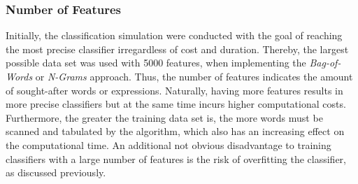 		\subsubsection{Number of Features}
			Initially, the classification simulation were conducted with the goal of reaching the most precise classifier irregardless of cost and duration. Thereby, the largest possible data set was used with 5000 features, when implementing the \textit{Bag-of-Words} or \textit{N-Grams} approach. Thus, the number of features indicates the amount of sought-after words or expressions. Naturally, having more features results in more precise classifiers but at the same time incurs higher computational costs. Furthermore, the greater the training data set is, the more words must be scanned and tabulated by the algorithm, which also has an increasing effect on the computational time. An additional not obvious disadvantage to training classifiers with a large number of features is the risk of overfitting the classifier, as discussed previously. 
			
